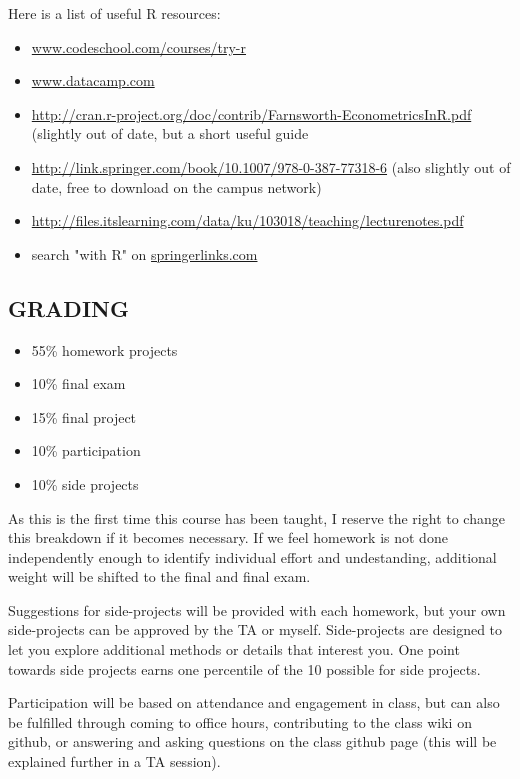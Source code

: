 \documentclass{scrartcl}
\begin{document}
Here is a list of useful R resources:
\begin{itemize}
\item \href{www.codeschool.com/courses/try-r}{www.codeschool.com/courses/try-r}
\item \href{www.datacamp.com}{www.datacamp.com}
\item \href{http://cran.r-project.org/doc/contrib/Farnsworth-EconometricsInR.pdf}{http://cran.r-project.org/doc/contrib/Farnsworth-EconometricsInR.pdf} (slightly out of date, but a short useful guide
\item \href{http://link.springer.com/book/10.1007/978-0-387-77318-6}{http://link.springer.com/book/10.1007/978-0-387-77318-6} (also slightly out of date, free to download on the campus network)
\item \href{http://files.itslearning.com/data/ku/103018/teaching/lecturenotes.pdf}{http://files.itslearning.com/data/ku/103018/teaching/lecturenotes.pdf}
\item search "with R" on \href{springerlinks.com}{springerlinks.com}
\end{itemize}

\subsection*{GRADING}
\begin{itemize}
\item 55\% homework projects
\item 10\% final exam
\item 15\% final project
\item 10\% participation 
\item 10\% side projects
\end{itemize}

As this is the first time this course has been taught, I reserve the right to change this breakdown if it becomes necessary. If we feel homework is not done independently enough to identify individual effort and undestanding, additional weight will be shifted to the final and final exam.

Suggestions for side-projects will be provided with each homework, but your own side-projects can be approved by the TA or myself. Side-projects are designed to let you explore additional methods or details that interest you. One point towards side projects earns one percentile of the 10 possible for side projects.

Participation will be based on attendance and engagement in class, but can also be fulfilled through coming to office hours, contributing to the class wiki on github, or answering and asking questions on the class github page (this will be explained further in a TA session).
\end{document}
